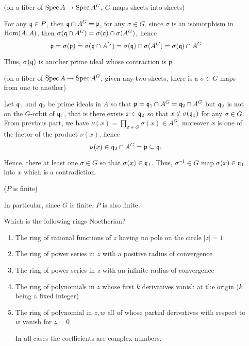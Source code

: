 \begin{longproof}
	(on a fiber of $\operatorname{Spec} A \to \operatorname{Spec} A^G$, $G$ maps sheets into sheets)
	
	For any $\mathfrak{q} \in P$, then $\mathfrak{q} \cap A^G = \mathfrak{p}$, for any $\sigma \in G$, since $\sigma$ is an isomorphism in $\operatorname{Hom}(A, A)$, then $\sigma(\mathfrak{q} \cap A^G) = \sigma(\mathfrak{q}) \cap \sigma(A^G)$, hence
	$$
		\mathfrak{p} = \sigma(\mathfrak{p}) = \sigma(\mathfrak{q} \cap A^G) = \sigma(\mathfrak{q}) \cap \sigma(A^G) = \sigma(\mathfrak{q}) \cap A^G
	$$
	
	Thus, $\sigma(\mathfrak{q})$ is another prime ideal whose contraction is $\mathfrak{p}$
	
	(on a fiber of $\operatorname{Spec} A \to \operatorname{Spec} A^G$, given any two sheets, there is a $\sigma \in G$ maps from one to another)
	
	Let $\mathfrak{q}_1$ and $\mathfrak{q}_2$ be prime ideals in $A$ so that $\mathfrak{p} = \mathfrak{q}_1 \cap A^G = \mathfrak{q}_2 \cap A^G$ but $\mathfrak{q}_2$ is not on the $G$-orbit of $\mathfrak{q}_1$, that is there exists $x \in \mathfrak{q}_2$ so that $x \notin \sigma(\mathfrak{q}_1)$ for any $\sigma \in G$. From previous part, we have $\nu(x) = \prod_{\sigma \in G} \sigma(x) \in A^G$, moreover $x$ is one of the factor of the product $\nu(x)$, hence 
	$$
		\nu(x) \in \mathfrak{q}_2 \cap A^G = \mathfrak{p} \subseteq \mathfrak{q}_1
	$$
	
	Hence, there at least one $\sigma \in G$ so that $\sigma(x) \in \mathfrak{q}_1$. Thus, $\sigma^{-1} \in G$ map $\sigma(x) \in \mathfrak{q}_1$ into $x$ which is a contradiction.
	
	($P$ is finite)
	
	In particular, since $G$ is finite, $P$ is also finite.
	
	
\end{longproof}

\begin{problem}
	Which is the following rings Noetherian?
	\begin{enumerate}
		\item The ring of rational functions of $z$ having no pole on the circle $|z| = 1$
		\item The ring of power series in $z$ with a positive radius of convergence
		\item The ring of power series in $z$ with an infinite radius of convergence
		\item The ring of polynomials in $z$ whose first $k$ derivatives vanish at the origin ($k$ being a fixed integer)
		\item The ring of polynomial in $z, w$ all of whose partial derivatives with respect to $w$ vanish for $z = 0$
		
		In all cases the coefficients are complex numbers.  
	\end{enumerate}
\end{problem}


